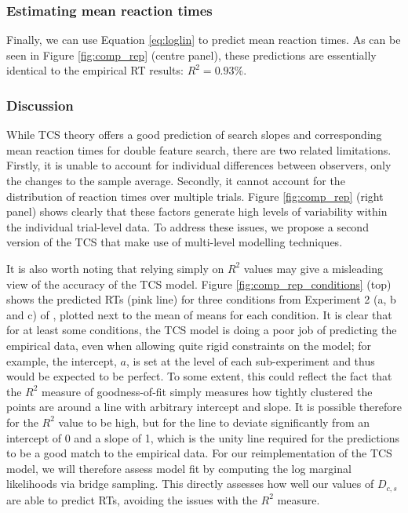 \documentclass[preprint,12pt,authoryear]{elsarticle}
\begin{document}
\subsubsection{Estimating mean reaction times}

Finally, we can use Equation \ref{eq:loglin} to predict mean reaction times. As can be seen in  Figure \ref{fig:comp_rep} (centre panel), these predictions are essentially identical to the empirical RT results: $R^2 = 0.93\%$.

\subsubsection{Discussion}

While TCS theory offers a good prediction of search slopes and corresponding mean reaction times for double feature search, there are two related limitations. Firstly, it is unable to account for individual differences between observers, only the changes to the sample average. Secondly, it cannot account for the distribution of reaction times over multiple trials. Figure \ref{fig:comp_rep} (right panel) shows clearly that these factors generate high levels of variability within the individual trial-level data. To address these issues, we propose a second version of the TCS that make use of multi-level modelling techniques.

It is also worth noting that relying simply on $R^2$ values may give a misleading view of the accuracy of the TCS model. Figure \ref{fig:comp_rep_conditions} (top) shows the predicted RTs (pink line) for three conditions from Experiment 2 (a, b and c) of \cite{buetti2019predicting}, plotted next to the mean of means for each condition. It is clear that for at least some conditions, the TCS model is doing a poor job of predicting the empirical data, even when allowing quite rigid constraints on the model; for example, the intercept, $a$, is set at the level of each sub-experiment and thus would be expected to be perfect. To some extent, this could reflect the fact that the $R^2$ measure of goodness-of-fit simply measures how tightly clustered the points are around a line with arbitrary intercept and slope. It is possible therefore for the $R^2$ value to be high, but for the line to deviate significantly from an intercept of 0 and a slope of 1, which is the unity line required for the predictions to be a good match to the empirical data. For our reimplementation of the TCS model, we will therefore assess model fit by computing the log marginal likelihoods via bridge sampling. This directly assesses how well our values of $D_{c,s}$ are able to predict RTs, avoiding the issues with the $R^2$ measure.
\end{document}
